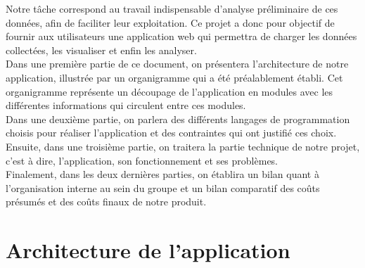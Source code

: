 	Notre tâche correspond au travail indispensable d’analyse préliminaire de ces données, afin de faciliter leur exploitation. Ce projet a donc pour objectif de fournir aux utilisateurs une application web qui permettra de charger les données collectées, les visualiser et enfin les analyser.\\
	
	Dans une première partie de ce document, on présentera l'architecture de notre application, illustrée par un organigramme qui a été préalablement établi. Cet organigramme représente un découpage de l'application en modules avec les différentes informations qui circulent entre ces modules.\\
	Dans une deuxième partie, on parlera des différents langages de programmation choisis pour réaliser l'application et des contraintes qui ont justifié ces choix.\\
	Ensuite, dans une troisième partie, on traitera la partie technique de notre projet, c'est à dire, l'application, son fonctionnement et ses problèmes.\\
	Finalement, dans les deux dernières parties, on établira un bilan quant à l'organisation interne au sein du groupe et un bilan comparatif des coûts présumés et des coûts finaux de notre produit.\\
	
			
	
	\section{Architecture de l'application}
